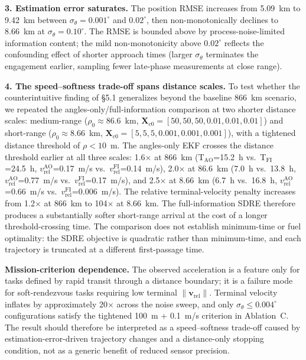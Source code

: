 \documentclass[preprint,3p,times]{elsarticle}
\begin{document}
\textbf{3. Estimation error saturates.} The position RMSE increases from 5.09~km to 9.42~km between $\sigma_\theta = 0.001^\circ$ and $0.02^\circ$, then non-monotonically declines to 8.66~km at $\sigma_\theta = 0.10^\circ$. The RMSE is bounded above by process-noise-limited information content; the mild non-monotonicity above $0.02^\circ$ reflects the confounding effect of shorter approach times (larger $\sigma_\theta$ terminates the engagement earlier, sampling fewer late-phase measurements at close range).

\textbf{4. The speed--softness trade-off spans distance scales.} To test whether the counterintuitive finding of §5.1 generalizes beyond the baseline 866~km scenario, we repeated the angles-only/full-information comparison at two shorter distance scales: medium-range ($\rho_0 \approx 86.6$~km, $\mathbf{X}_{c0} = [50, 50, 50, 0.01, 0.01, 0.01]$) and short-range ($\rho_0 \approx 8.66$~km, $\mathbf{X}_{c0} = [5, 5, 5, 0.001, 0.001, 0.001]$), with a tightened distance threshold of $\rho < 10$~m. The angles-only EKF crosses the distance threshold earlier at all three scales: 1.6$\times$ at 866~km (T$_{\text{AO}}$=15.2~h vs.\ T$_{\text{FI}}$=24.5~h, $v_{\text{rel}}^{\text{AO}}$=0.17~m/s vs.\ $v_{\text{rel}}^{\text{FI}}$=0.14~m/s), 2.0$\times$ at 86.6~km (7.0~h vs.\ 13.8~h, $v_{\text{rel}}^{\text{AO}}$=0.77~m/s vs.\ $v_{\text{rel}}^{\text{FI}}$=0.17~m/s), and 2.5$\times$ at 8.66~km (6.7~h vs.\ 16.8~h, $v_{\text{rel}}^{\text{AO}}$=0.66~m/s vs.\ $v_{\text{rel}}^{\text{FI}}$=0.006~m/s). The relative terminal-velocity penalty increases from 1.2$\times$ at 866~km to 104$\times$ at 8.66~km. The full-information SDRE therefore produces a substantially softer short-range arrival at the cost of a longer threshold-crossing time. The comparison does not establish minimum-time or fuel optimality: the SDRE objective is quadratic rather than minimum-time, and each trajectory is truncated at a different first-passage time.

\textbf{Mission-criterion dependence.} The observed acceleration is a feature only for tasks defined by rapid transit through a distance boundary; it is a failure mode for soft-rendezvous tasks requiring low terminal $\|\mathbf{v}_{\text{rel}}\|$. Terminal velocity inflates by approximately 20$\times$ across the noise sweep, and only $\sigma_\theta \le 0.004^\circ$ configurations satisfy the tightened 100~m + 0.1~m/s criterion in Ablation~C. The result should therefore be interpreted as a speed--softness trade-off caused by estimation-error-driven trajectory changes and a distance-only stopping condition, not as a generic benefit of reduced sensor precision.
\end{document}
